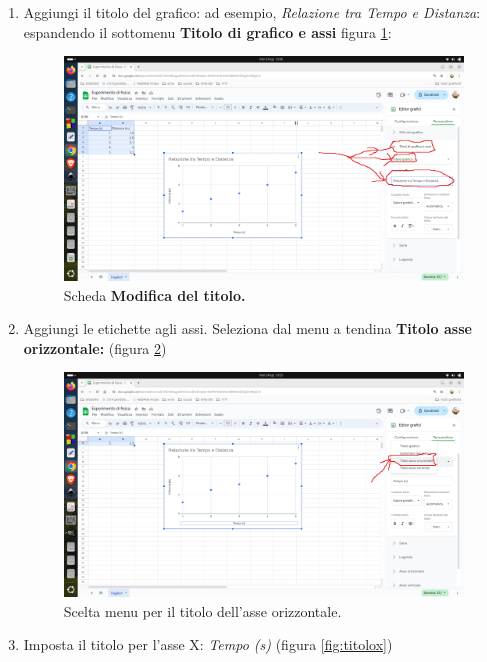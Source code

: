 \documentclass[12pt,a4paper,oneside]{book}
\theoremstyle{esercizio}
\begin{document}
\begin{enumerate}
    
    \item Aggiungi il titolo del grafico: ad esempio, \textit{Relazione tra Tempo e Distanza}: espandendo il sottomenu \textbf{Titolo di grafico e assi} figura \ref{fig:titolo}:
    
 \begin{figure}[h!]
    \centering
    \includegraphics[width=\linewidth]{path_to_image/titolo.png} 
    \caption{Scheda \textbf{Modifica del titolo.}}
    \label{fig:titolo}
\end{figure} 
    
    \item Aggiungi le etichette agli assi. Seleziona dal menu a tendina \textbf{Titolo asse orizzontale: } (figura \ref{fig:sceltax})
        \begin{figure}[h!]
    \centering
    \includegraphics[width=\linewidth]{path_to_image/sceltax.png} 
    \caption{Scelta menu per il titolo dell'asse orizzontale.}
    \label{fig:sceltax}
\end{figure}  
        
        
        \item Imposta il titolo per l'asse X: \textit{Tempo (s)} (figura \ref{fig:titolox})
        

\end{enumerate}
\end{document}
